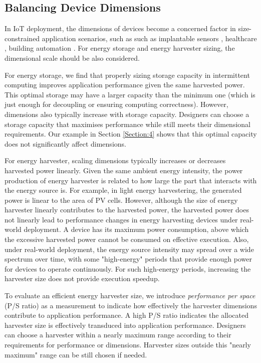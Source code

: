 \subsection{Balancing Device Dimensions}

In IoT deployment, the dimensions of devices become a concerned factor in size-constrained application scenarios, such as such as implantable sensors \cite{5627952}, healthcare \cite{6579688}, building automation \cite{6064380}. For energy storage and energy harvester sizing, the dimensional scale should be also considered. 

For energy storage, we find that properly sizing storage capacity in intermittent computing improves application performance given the same harvested power. This optimal storage may have a larger capacity than the minimum one (which is just enough for decoupling or ensuring computing correctness). However, dimensions also typically increase with storage capacity. Designers can choose a storage capacity that maximises performance while still meets their dimensional requirements. Our example in Section \ref{Section:4} shows that this optimal capacity does not significantly affect dimensions.

For energy harvester, scaling dimensions typically increases or decreases harvested power linearly. Given the same ambient energy intensity, the power production of energy harvester is related to how large the part that interacts with the energy source is. For example, in light energy harvestering, the generated power is linear to the area of PV cells. However, although the size of energy harvester linearly contributes to the harvested power, the harvested power does not linearly lead to performance changes in energy harvesting devices under real-world deployment. A device has its maximum power consumption, above which the excessive harvested power cannot be consumed on effective execution. Also, under real-world deployment, the energy source intensity may spread over a wide spectrum over time, with some "high-energy" periods that provide enough power for devices to operate continuously. For such high-energy periods, increasing the harvester size does not provide execution speedup. 


To evaluate an efficient energy harvester size, we introduce \textit{performance per space} (P/S ratio) as a measurement to indicate how effectively the harvester dimensions contribute to application performance. A high P/S ratio indicates the allocated harvester size is effectively transduced into application performance. Designers can choose a harvester within a nearly maximum range according to their requirements for performance or dimensions. Harvester sizes outside this "nearly maximum" range can be still chosen if needed.



